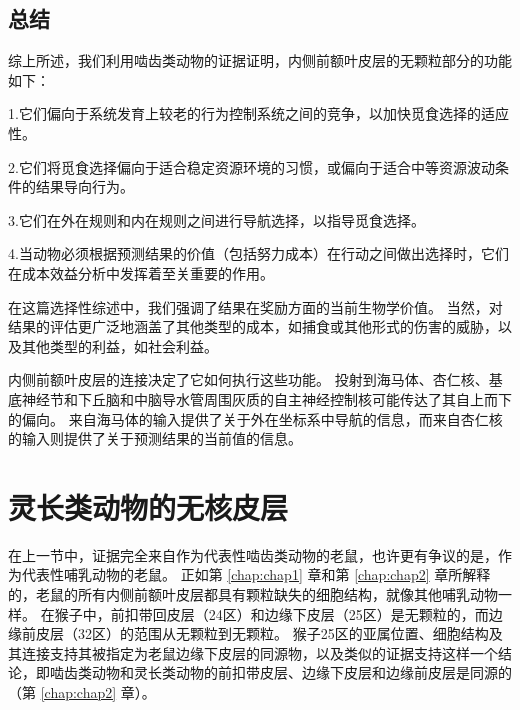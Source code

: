 \subsection{总结}

综上所述，我们利用啮齿类动物的证据证明，内侧前额叶皮层的无颗粒部分的功能如下：\par


1.它们偏向于系统发育上较老的行为控制系统之间的竞争，以加快觅食选择的适应性。\par


2.它们将觅食选择偏向于适合稳定资源环境的习惯，或偏向于适合中等资源波动条件的结果导向行为。\par


3.它们在外在规则和内在规则之间进行导航选择，以指导觅食选择。\par


4.当动物必须根据预测结果的价值（包括努力成本）在行动之间做出选择时，它们在成本效益分析中发挥着至关重要的作用。\par


在这篇选择性综述中，我们强调了结果在奖励方面的当前生物学价值。
当然，对结果的评估更广泛地涵盖了其他类型的成本，如捕食或其他形式的伤害的威胁，以及其他类型的利益，如社会利益。\par


内侧前额叶皮层的连接决定了它如何执行这些功能。
投射到海马体、杏仁核、基底神经节和下丘脑和中脑导水管周围灰质的自主神经控制核可能传达了其自上而下的偏向。
来自海马体的输入提供了关于外在坐标系中导航的信息，而来自杏仁核的输入则提供了关于预测结果的当前值的信息。\par



\section{灵长类动物的无核皮层}

在上一节中，证据完全来自作为代表性啮齿类动物的老鼠，也许更有争议的是，作为代表性哺乳动物的老鼠。
正如第 \ref{chap:chap1} 章和第 \ref{chap:chap2} 章所解释的，老鼠的所有内侧前额叶皮层都具有颗粒缺失的细胞结构，就像其他哺乳动物一样。
在猴子中，前扣带回皮层（24区）和边缘下皮层（25区）是无颗粒的，而边缘前皮层（32区）的范围从无颗粒到无颗粒\cite{Vogt&Derbyshire,2009;Mackey&Petrides,2010}。
猴子25区的亚属位置、细胞结构及其连接\cite{freedman2000subcortical}支持其被指定为老鼠边缘下皮层的同源物，以及类似的证据支持这样一个结论，即啮齿类动物和灵长类动物的前扣带皮层、边缘下皮层和边缘前皮层是同源的（第 \ref{chap:chap2} 章）。\par



